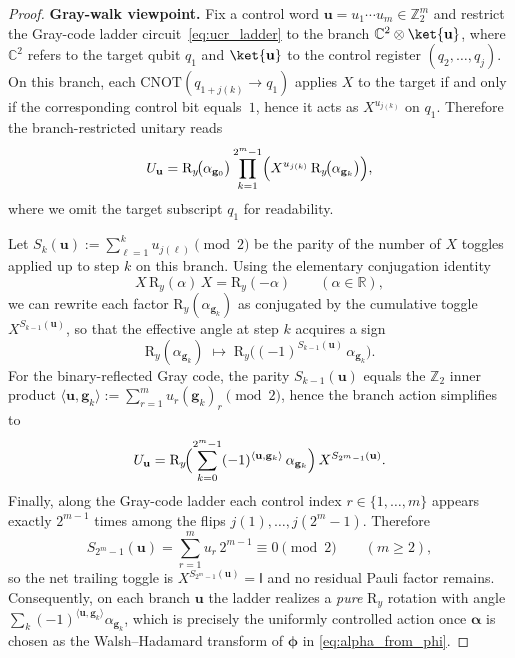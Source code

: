 \documentclass{article}
\newcommand{\rI}{\mathsf{I}}
\newcommand{\RY}{\mathrm{R}_y}
\newcommand{\CNOT}{\mathrm{CNOT}}
\numberwithin{equation}{section}
\begin{document}
\begin{proof}
\noindent\textbf{Gray-walk viewpoint.}
Fix a control word $\mathbf{u}=u_1\cdots u_m\in\mathbb{Z}_2^m$ and restrict the Gray-code
ladder circuit~\eqref{eq:ucr_ladder} to the branch $\mathbb{C}^2\otimes\ket{\mathbf{u}}$, where
$\mathbb{C}^2$ refers to the target qubit $q_1$ and $\ket{\mathbf{u}}$ to the control register
$(q_2,\dots,q_j)$.
On this branch, each $\CNOT(q_{1+j(k)}\to q_1)$ applies $X$ to the target if and only if the
corresponding control bit equals~$1$, hence it acts as $X^{u_{j(k)}}$ on $q_1$.
Therefore the branch-restricted unitary reads
\[
U_{\mathbf{u}}
=
\RY\!\bigl(\alpha_{\mathbf{g}_0}\bigr)
\prod_{k=1}^{2^m-1}\Bigl(X^{u_{j(k)}}\,\RY\!\bigl(\alpha_{\mathbf{g}_k}\bigr)\Bigr),
\]
where we omit the target subscript $q_1$ for readability.

Let $S_k(\mathbf u):=\sum_{\ell=1}^{k} u_{j(\ell)}\pmod 2$ be the parity of the number of $X$ toggles
applied up to step $k$ on this branch. Using the elementary conjugation identity
\[
X\,\RY(\alpha)\,X=\RY(-\alpha)\qquad(\alpha\in\mathbb{R}),
\]
we can rewrite each factor $\RY(\alpha_{\mathbf{g}_k})$ as conjugated by the cumulative toggle $X^{S_{k-1}(\mathbf u)}$,
so that the effective angle at step $k$ acquires a sign
\[
\RY(\alpha_{\mathbf{g}_k})
\;\longmapsto\;
\RY\!\bigl((-1)^{S_{k-1}(\mathbf u)}\,\alpha_{\mathbf{g}_k}\bigr).
\]
For the binary-reflected Gray code, the parity $S_{k-1}(\mathbf{u})$ equals the $\mathbb{Z}_2$ inner product
$\langle \mathbf{u},\mathbf{g}_k\rangle:=\sum_{r=1}^m u_r (\mathbf{g}_k)_r\pmod 2$, hence the branch action simplifies to
\[
U_{\mathbf{u}}
=
\RY\!\Bigl(\sum_{k=0}^{2^m-1} (-1)^{\langle \mathbf{u},\mathbf{g}_k\rangle}\,\alpha_{\mathbf{g}_k}\Bigr)\,X^{S_{2^m-1}(\mathbf{u})}.
\]
Finally, along the Gray-code ladder each control index $r\in\{1,\dots,m\}$ appears exactly $2^{m-1}$ times
among the flips $j(1),\dots,j(2^m-1)$. Therefore
\[
S_{2^m-1}(\mathbf{u})=\sum_{r=1}^m u_r\,2^{m-1}\equiv 0\pmod 2
\qquad (m\ge 2),
\]
so the net trailing toggle is $X^{S_{2^m-1}(\mathbf{u})}=\rI$ and no residual Pauli factor remains.
Consequently, on each branch $\mathbf{u}$ the ladder realizes a \emph{pure} $\RY$ rotation with angle
$\sum_{k}(-1)^{\langle \mathbf{u},\mathbf{g}_k\rangle}\alpha_{\mathbf{g}_k}$, which is precisely the uniformly controlled action
once $\bm{\alpha}$ is chosen as the Walsh--Hadamard transform of $\bm{\phi}$ in \eqref{eq:alpha_from_phi}.



\end{proof}
\end{document}
